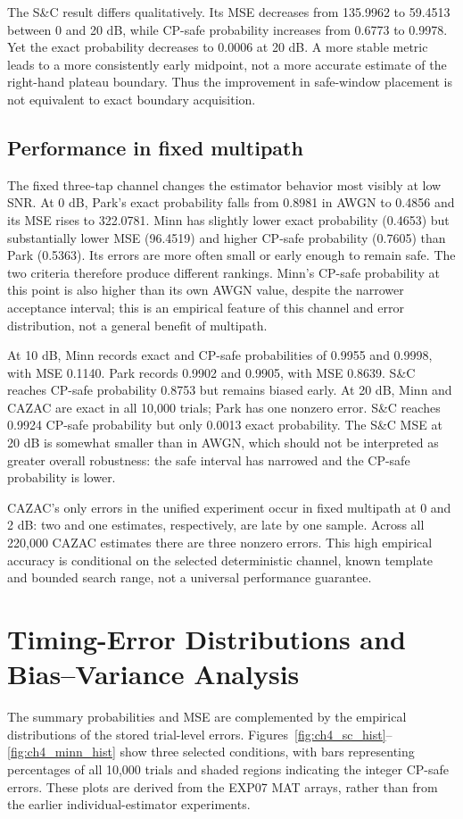 The S\&C result differs qualitatively. Its MSE decreases from 135.9962 to 59.4513 between 0 and 20 dB, while CP-safe probability increases from 0.6773 to 0.9978. Yet the exact probability decreases to 0.0006 at 20 dB. A more stable metric leads to a more consistently early midpoint, not a more accurate estimate of the right-hand plateau boundary. Thus the improvement in safe-window placement is not equivalent to exact boundary acquisition.

\subsection{Performance in fixed multipath}
The fixed three-tap channel changes the estimator behavior most visibly at low SNR. At 0 dB, Park's exact probability falls from 0.8981 in AWGN to 0.4856 and its MSE rises to 322.0781. Minn has slightly lower exact probability (0.4653) but substantially lower MSE (96.4519) and higher CP-safe probability (0.7605) than Park (0.5363). Its errors are more often small or early enough to remain safe. The two criteria therefore produce different rankings. Minn's CP-safe probability at this point is also higher than its own AWGN value, despite the narrower acceptance interval; this is an empirical feature of this channel and error distribution, not a general benefit of multipath.

At 10 dB, Minn records exact and CP-safe probabilities of 0.9955 and 0.9998, with MSE 0.1140. Park records 0.9902 and 0.9905, with MSE 0.8639. S\&C reaches CP-safe probability 0.8753 but remains biased early. At 20 dB, Minn and CAZAC are exact in all 10,000 trials; Park has one nonzero error. S\&C reaches 0.9924 CP-safe probability but only 0.0013 exact probability. The S\&C MSE at 20 dB is somewhat smaller than in AWGN, which should not be interpreted as greater overall robustness: the safe interval has narrowed and the CP-safe probability is lower.

CAZAC's only errors in the unified experiment occur in fixed multipath at 0 and 2 dB: two and one estimates, respectively, are late by one sample. Across all 220,000 CAZAC estimates there are three nonzero errors. This high empirical accuracy is conditional on the selected deterministic channel, known template and bounded search range, not a universal performance guarantee.

\section[Error Distributions and Bias]{Timing-Error Distributions and Bias--Variance Analysis}
\label{sec:ch4_distribution}
The summary probabilities and MSE are complemented by the empirical distributions of the stored trial-level errors. Figures~\ref{fig:ch4_sc_hist}--\ref{fig:ch4_minn_hist} show three selected conditions, with bars representing percentages of all 10,000 trials and shaded regions indicating the integer CP-safe errors. These plots are derived from the EXP07 MAT arrays, rather than from the earlier individual-estimator experiments.


